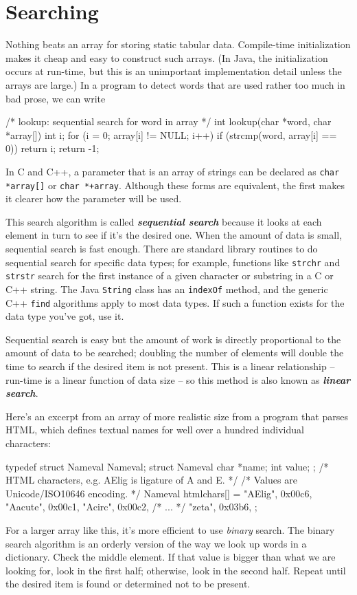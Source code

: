 \section{Searching}
Nothing beats an array for storing static tabular data. Compile-time
initialization makes it cheap and easy to construct such arrays. (In Java,
the initialization occurs at run-time, but this is an unimportant
implementation detail unless the arrays are large.) In a program to detect
words that are used rather too much in bad prose, we can write
\begin{wellcode}
    /* lookup: sequential search for word in array */
    int lookup(char *word, char *array[])
    {
        int i;
        for (i = 0; array[i] != NULL; i++)
           if (strcmp(word, array[i] == 0))
                return i;
        return -1;
    }
\end{wellcode}
In C and C++, a parameter that is an array of strings can be declared as
\verb"char *array[]" or \verb"char *+array". Although these forms are
equivalent, the first makes it clearer how the parameter will be used.

This search algorithm is called \textbf{\textit{sequential search}} because
it looks at each element in turn to see if it's the desired one. When the
amount of data is small, sequential search is fast enough. There are
standard library routines to do sequential search for specific data types;
for example, functions like \texttt{strchr} and \texttt{strstr} search for
the first instance of a given character or substring in a C or C++ string.
The Java \verb'String' class has an \verb'indexOf' method, and the generic
C++ \verb'find' algorithms apply to most data types. If such a function
exists for the data type you've got, use it.

Sequential search is easy but the amount of work is directly proportional
to the amount of data to be searched; doubling the number of elements will
double the time to search if the desired item is not present. This is a
linear relationship -- run-time is a linear function of data size -- so
this method is also known as \textbf{\textit{linear search}}.


Here's an excerpt from an array of more realistic size from a program that
parses HTML, which defines textual names for well over a hundred individual
characters:
\begin{wellcode}
    typedef struct Nameval Nameval;
    struct Nameval{
        char *name;
        int value;
    };
    /* HTML characters, e.g. AElig is ligature of A and E. */
    /* Values are Unicode/ISO10646 encoding. */
    Nameval htmlchars[] = {
        "AElig",    0x00c6,
        "Aacute",   0x00c1,
        "Acirc",    0x00c2,
        /* ... */
        "zeta",     0x03b6,
    };
\end{wellcode}
For a larger array like this, it's more efficient to use
\textit{binary} search. The binary search algorithm is an orderly
version of the way we look up words in a dictionary. Check the middle
element. If that value is bigger than what we are looking for, look in the
first half; otherwise, look in the second half. Repeat until the desired
item is found or determined not to be present.

